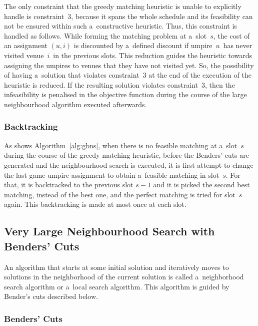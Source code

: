 \documentclass[a4paper, 10pt, twocolumn]{article}
\begin{document}
    The only constraint that the greedy matching heuristic is unable to
    explicitly handle is constraint~3, because it spans the whole schedule
    and its feasibility can not be ensured within such a~constructive
    heuristic. Thus, this constraint is handled as follows. While forming
    the matching problem at a~slot~$ s $, the cost of an assignment
    $ (u, i) $ is discounted by a~defined discount if umpire~$ u $~has
    never visited venue~$ i $~in the previous slots. This reduction
    guides the heuristic towards assigning the umpires to venues that they
    have not visited yet. So, the possibility of having a~solution that
    violates constraint~3 at the end of the execution of the heuristic is
    reduced. If the resulting solution violates constraint~3, then the
    infeasibility is penalised in the objective function during the course
    of the large neighbourhood algorithm executed afterwards.

    \subsubsection{Backtracking}

    As shows Algorithm~\ref{alg:gbns}, when there is no feasible matching
    at a~slot~$ s $ during the course of the greedy matching heuristic,
    before the Benders' cuts are generated and the neighbourhood search is
    executed, it is first attempt to change the last game-umpire assignment
    to obtain a~feasible matching in slot~$ s $. For that, it is backtracked
    to the previous slot $ s - 1 $ and it is picked the second best
    matching, instead of the best one, and the perfect matching is tried
    for slot~$ s $ again. This backtracking is made at most once at each
    slot.

    \subsection{Very Large Neighbourhood Search with Benders' Cuts}

    An algorithm that starts at some initial solution and iteratively
    moves to solutions in the neighborhood of the current
    solution is called a~neighborhood search algorithm or a~local
    search algorithm. This algorithm is guided by Bender's cuts described
    below.

    \subsubsection{Benders' Cuts}
\end{document}
